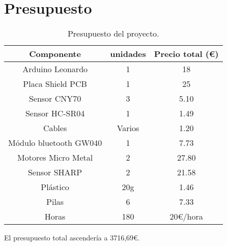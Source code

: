 \chapter{Presupuesto}
\begin{table}[htbp]
	\begin{center}
		\begin{tabular}{|c|c|c|}
			\hline 
			\textbf{Componente} & \textbf{unidades} & \textbf{Precio total (\euro)}  \\
			\hline
			Arduino Leonardo & 1 & 18 \\\hline
			Placa Shield PCB & 1 & 25 \\\hline
			Sensor CNY70 & 3 & 5.10 \\\hline
			Sensor HC-SR04 & 1 & 1.49 \\\hline
			Cables & Varios & 1.20 \\\hline
			Módulo bluetooth GW040 & 1 & 7.73 \\\hline
			Motores Micro Metal & 2 & 27.80 \\\hline
			Sensor SHARP & 2 & 21.58 \\\hline
			Plástico & 20g & 1.46 \\\hline
			Pilas & 6 & 7.33 \\\hline
			Horas & 180 & 20€/hora \\\hline
		\end{tabular}
		\caption{Presupuesto del proyecto.}
		\label{tabla:Presupuesto del proyecto}
	\end{center}
\end{table}

El presupuesto total ascendería a 3716,69\euro.